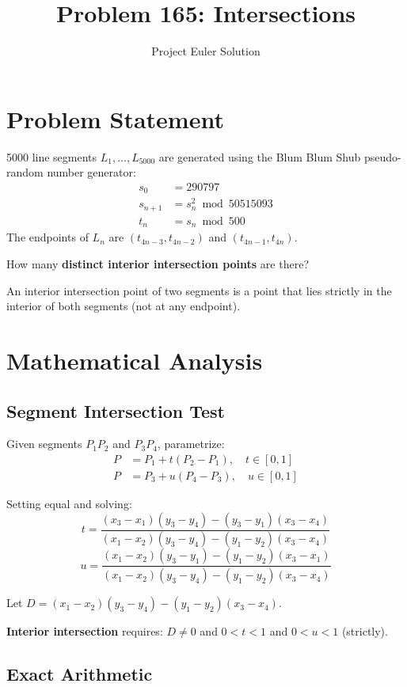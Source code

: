 \documentclass[12pt]{article}
\title{Problem 165: Intersections}
\author{Project Euler Solution}
\date{}
\begin{document}
\maketitle

\section{Problem Statement}
5000 line segments $L_1, \ldots, L_{5000}$ are generated using the Blum Blum Shub pseudo-random number generator:
\begin{align*}
s_0 &= 290797 \\
s_{n+1} &= s_n^2 \bmod 50515093 \\
t_n &= s_n \bmod 500
\end{align*}
The endpoints of $L_n$ are $(t_{4n-3}, t_{4n-2})$ and $(t_{4n-1}, t_{4n})$.

How many \textbf{distinct interior intersection points} are there?

An interior intersection point of two segments is a point that lies strictly in the interior of both segments (not at any endpoint).

\section{Mathematical Analysis}

\subsection{Segment Intersection Test}

Given segments $P_1P_2$ and $P_3P_4$, parametrize:
\begin{align*}
P &= P_1 + t(P_2 - P_1), \quad t \in [0,1] \\
P &= P_3 + u(P_4 - P_3), \quad u \in [0,1]
\end{align*}

Setting equal and solving:
\[
t = \frac{(x_3 - x_1)(y_3 - y_4) - (y_3 - y_1)(x_3 - x_4)}{(x_1 - x_2)(y_3 - y_4) - (y_1 - y_2)(x_3 - x_4)}
\]
\[
u = \frac{(x_1 - x_2)(y_3 - y_1) - (y_1 - y_2)(x_3 - x_1)}{(x_1 - x_2)(y_3 - y_4) - (y_1 - y_2)(x_3 - x_4)}
\]

Let $D = (x_1 - x_2)(y_3 - y_4) - (y_1 - y_2)(x_3 - x_4)$.

\textbf{Interior intersection} requires: $D \neq 0$ and $0 < t < 1$ and $0 < u < 1$ (strictly).

\subsection{Exact Arithmetic}
\end{document}
